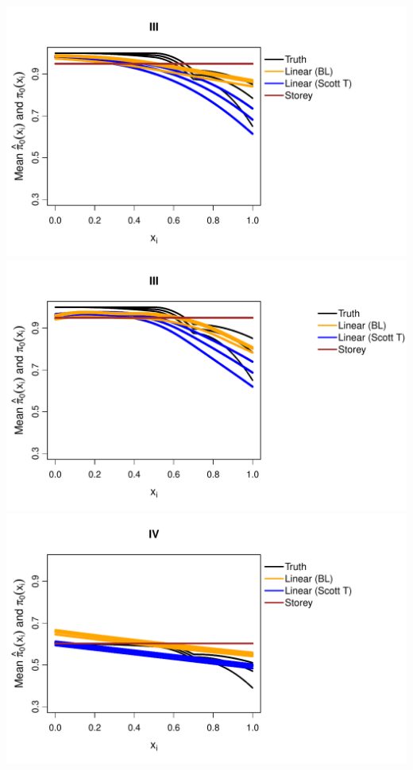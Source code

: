 \documentclass{article}\usepackage[]{graphicx}\usepackage[]{color}
\makeatletter
\def\maxwidth{ %
  \ifdim\Gin@nat@width>\linewidth
    \linewidth
  \else
    \Gin@nat@width
  \fi
}
\newenvironment{knitrout}{}{} %
\makeatother
\begin{document}
\begin{knitrout}
{\includegraphics[width=\maxwidth]{Figures/plot_of_mean_estimates_t_10000-4} 
\includegraphics[width=\maxwidth]{Figures/plot_of_mean_estimates_t_10000-5} 
\includegraphics[width=\maxwidth]{Figures/plot_of_mean_estimates_t_10000-6} 
}
\end{knitrout}
\end{document}
